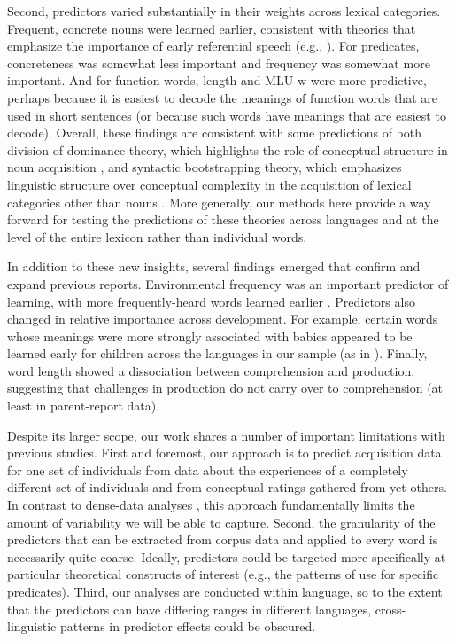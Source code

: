\documentclass[
   11pt,
       ]{book}
\begin{document}
Second, predictors varied substantially in their weights across lexical categories. Frequent, concrete nouns were learned earlier, consistent with theories that emphasize the importance of early referential speech (e.g., \citealp{baldwin1995}). For predicates, concreteness was somewhat less important and frequency was somewhat more important. And for function words, length and MLU-w were more predictive, perhaps because it is easiest to decode the meanings of function words that are used in short sentences (or because such words have meanings that are easiest to decode). Overall, these findings are consistent with some predictions of both division of dominance theory, which highlights the role of conceptual structure in noun acquisition \citep{gentner2001}, and syntactic bootstrapping theory, which emphasizes linguistic structure over conceptual complexity in the acquisition of lexical categories other than nouns \citep{snedeker2007}. More generally, our methods here provide a way forward for testing the predictions of these theories across languages and at the level of the entire lexicon rather than individual words.

In addition to these new insights, several findings emerged that confirm and expand previous reports. Environmental frequency was an important predictor of learning, with more frequently-heard words learned earlier \citep{goodman2008,swingley2017}. Predictors also changed in relative importance across development. For example, certain words whose meanings were more strongly associated with babies appeared to be learned early for children across the languages in our sample (as in \citealp{tardif2008}). Finally, word length showed a dissociation between comprehension and production, suggesting that challenges in production do not carry over to comprehension (at least in parent-report data).

Despite its larger scope, our work shares a number of important limitations with previous studies. First and foremost, our approach is to predict acquisition data for one set of individuals from data about the experiences of a completely different set of individuals and from conceptual ratings gathered from yet others. In contrast to dense-data analyses \citep{roy2015}, this approach fundamentally limits the amount of variability we will be able to capture. Second, the granularity of the predictors that can be extracted from corpus data and applied to every word is necessarily quite coarse. Ideally, predictors could be targeted more specifically at particular theoretical constructs of interest (e.g., the patterns of use for specific predicates). Third, our analyses are conducted within language, so to the extent that the predictors can have differing ranges in different languages, cross-linguistic patterns in predictor effects could be obscured.
\end{document}
